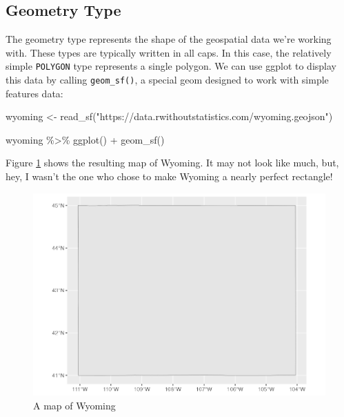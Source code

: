 \documentclass[
]{book}
\newenvironment{Shaded}{\begin{snugshade}}{\end{snugshade}}
\newcommand{\FunctionTok}[1]{\textcolor[rgb]{0.00,0.00,0.00}{#1}}
\newcommand{\NormalTok}[1]{#1}
\newcommand{\OtherTok}[1]{\textcolor[rgb]{0.56,0.35,0.01}{#1}}
\newcommand{\SpecialCharTok}[1]{\textcolor[rgb]{0.00,0.00,0.00}{#1}}
\newcommand{\StringTok}[1]{\textcolor[rgb]{0.31,0.60,0.02}{#1}}
\begin{document}
\hypertarget{geometry-type}{%
\subsection*{Geometry Type}\label{geometry-type}}

The geometry type represents the shape of the geospatial data we're working with. These types are typically written in all caps. In this case, the relatively simple \texttt{POLYGON} type represents a single polygon. We can use ggplot to display this data by calling \texttt{geom\_sf()}, a special geom designed to work with simple features data:

\begin{Shaded}
\begin{Highlighting}[]
\NormalTok{wyoming }\OtherTok{\textless{}{-}} \FunctionTok{read\_sf}\NormalTok{(}\StringTok{"https://data.rwithoutstatistics.com/wyoming.geojson"}\NormalTok{)}

\NormalTok{wyoming }\SpecialCharTok{\%\textgreater{}\%}
  \FunctionTok{ggplot}\NormalTok{() }\SpecialCharTok{+}
  \FunctionTok{geom\_sf}\NormalTok{()}
\end{Highlighting}
\end{Shaded}

Figure \ref{fig:wyoming-map-plot} shows the resulting map of Wyoming. It may not look like much, but, hey, I wasn't the one who chose to make Wyoming a nearly perfect rectangle!

\begin{figure}
\includegraphics[width=1\linewidth]{maps_files/figure-latex/wyoming-map-plot-1} \caption{A map of Wyoming}\label{fig:wyoming-map-plot}
\end{figure}
\end{document}
